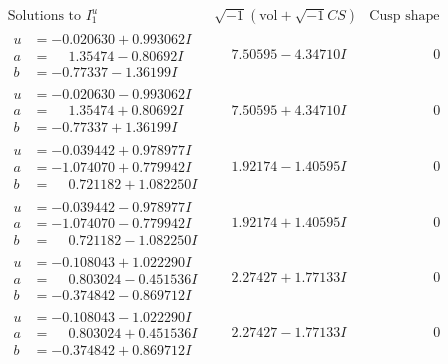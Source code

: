 \documentclass[1p]{elsarticle_modified}
\theoremstyle{definition}
\newcommand{\I}{\sqrt{-1}}
\begin{document}
$$\begin{array}{c|c|c}  
\text{Solutions to }I^u_{1}& \I (\text{vol} + \sqrt{-1}CS) & \text{Cusp shape}\\
 \hline 
\begin{aligned}
u &= -0.020630 + 0.993062 I \\
a &= \phantom{-}1.35474 - 0.80692 I \\
b &= -0.77337 - 1.36199 I\end{aligned}
 & \phantom{-}7.50595 - 4.34710 I & \phantom{-0.000000 } 0 \\ \hline\begin{aligned}
u &= -0.020630 - 0.993062 I \\
a &= \phantom{-}1.35474 + 0.80692 I \\
b &= -0.77337 + 1.36199 I\end{aligned}
 & \phantom{-}7.50595 + 4.34710 I & \phantom{-0.000000 } 0 \\ \hline\begin{aligned}
u &= -0.039442 + 0.978977 I \\
a &= -1.074070 + 0.779942 I \\
b &= \phantom{-}0.721182 + 1.082250 I\end{aligned}
 & \phantom{-}1.92174 - 1.40595 I & \phantom{-0.000000 } 0 \\ \hline\begin{aligned}
u &= -0.039442 - 0.978977 I \\
a &= -1.074070 - 0.779942 I \\
b &= \phantom{-}0.721182 - 1.082250 I\end{aligned}
 & \phantom{-}1.92174 + 1.40595 I & \phantom{-0.000000 } 0 \\ \hline\begin{aligned}
u &= -0.108043 + 1.022290 I \\
a &= \phantom{-}0.803024 - 0.451536 I \\
b &= -0.374842 - 0.869712 I\end{aligned}
 & \phantom{-}2.27427 + 1.77133 I & \phantom{-0.000000 } 0 \\ \hline\begin{aligned}
u &= -0.108043 - 1.022290 I \\
a &= \phantom{-}0.803024 + 0.451536 I \\
b &= -0.374842 + 0.869712 I\end{aligned}
 & \phantom{-}2.27427 - 1.77133 I & \phantom{-0.000000 } 0 \\ \hline\begin{aligned}

\end{aligned}
\end{array}$$
\end{document}
